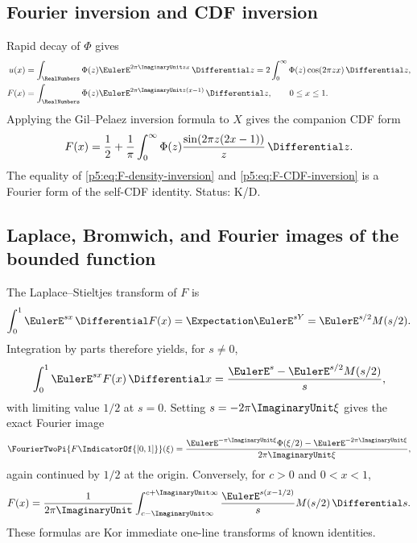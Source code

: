 \documentclass[11pt]{article}
\theoremstyle{definition}
\theoremstyle{remark}
\newcommand{\statusknown}{\textsf{K}}
\newcommand{\statusderived}{\textsf{D}}
\begin{document}
\subsection{Fourier inversion and CDF inversion}

Rapid decay of $\Phi$ gives
\begin{align}
 u(x)&=\int_{\RealNumbers}\Phi(z)\EulerE^{2\pi\ImaginaryUnit zx}\,\Differential z
      =2\int_0^{\infty}\Phi(z)\cos(2\pi zx)\,\Differential z,        \label{p5:eq:u-Fourier-inversion}\\
 F(x)&=\int_{\RealNumbers}\Phi(z)\EulerE^{2\pi\ImaginaryUnit z(x-1)}\,\Differential z,
      \qquad 0\le x\le1.                                  \label{p5:eq:F-density-inversion}
\end{align}
Applying the Gil--Pelaez inversion formula to $X$ gives the companion CDF form
\begin{equation}
 F(x)=\frac12+\frac1\pi\int_0^{\infty}
       \Phi(z)\frac{\sin(2\pi z(2x-1))}{z}\,\Differential z.         \label{p5:eq:F-CDF-inversion}
\end{equation}
The equality of \eqref{p5:eq:F-density-inversion} and
\eqref{p5:eq:F-CDF-inversion} is a Fourier form of the self-CDF identity.
Status: \statusknown/\statusderived.

\subsection{Laplace, Bromwich, and Fourier images of the bounded function}

The Laplace--Stieltjes transform of $F$ is
\begin{equation}
 \int_0^1\EulerE^{sx}\,\Differential F(x)=\Expectation\EulerE^{sY}
 =\EulerE^{s/2}M(s/2).                                          \label{p5:eq:F-LS}
\end{equation}
Integration by parts therefore yields, for $s\ne0$,
\begin{equation}
 \int_0^1\EulerE^{sx}F(x)\,\Differential x
 =\frac{\EulerE^s-\EulerE^{s/2}M(s/2)}{s},                           \label{p5:eq:F-Laplace}
\end{equation}
with limiting value $1/2$ at $s=0$.  Setting $s=-2\pi\ImaginaryUnit\xi$ gives the exact
Fourier image
\begin{equation}
 \FourierTwoPi{F\IndicatorOf{[0,1]}}(\xi)
 =\frac{\EulerE^{-\pi\ImaginaryUnit\xi}\Phi(\xi/2)-\EulerE^{-2\pi\ImaginaryUnit\xi}}
        {2\pi\ImaginaryUnit\xi},                                    \label{p5:eq:F-Fourier}
\end{equation}
again continued by $1/2$ at the origin.  Conversely, for $c>0$ and
$0<x<1$,
\begin{equation}
 F(x)=\frac1{2\pi\ImaginaryUnit}\int_{c-\ImaginaryUnit\infty}^{c+\ImaginaryUnit\infty}
       \frac{\EulerE^{s(x-1/2)}}{s}M(s/2)\,\Differential s.               \label{p5:eq:F-Bromwich}
\end{equation}
These formulas are \statusknown or immediate one-line transforms of known
identities.
\end{document}
